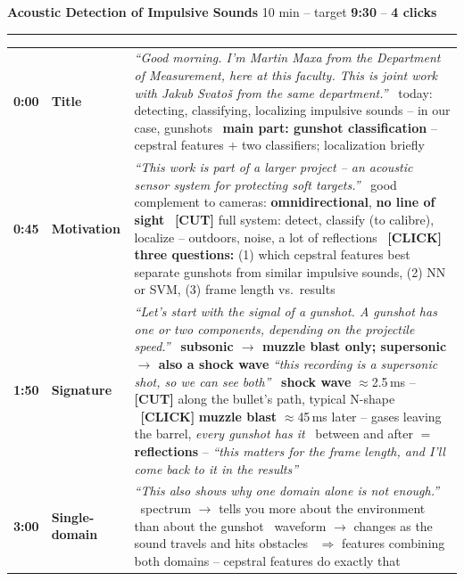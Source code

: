 \documentclass[10pt,a4paper]{article}
\newcommand{\say}[1]{\textit{\color{black!75}``#1''}}
\newcommand{\bt}{\newline\raisebox{0.15ex}{\tiny$\blacksquare$}~}
\newcommand{\cue}[3]{%
  \textbf{\color{ctublue}#1} & \textbf{#2} & #3 \\[1.5ex]}
\begin{document}
{\large\bfseries Acoustic Detection of Impulsive Sounds}\hfill
{\small 10 min -- target \textbf{9:30} -- \textbf{4 clicks}}

\vspace{0.5mm}\hrule\vspace{2mm}

{\small
\begin{tabular}{@{}>{\raggedright\arraybackslash}p{10mm} >{\raggedright\arraybackslash}p{19mm} >{\raggedright\arraybackslash}p{147mm}@{}}

\cue{0:00}{Title}{%
  \say{Good morning. I'm Martin Maxa from the Department of Measurement, here at this
  faculty. This is joint work with Jakub Svatoš from the same department.}
  \bt today: detecting, classifying, localizing impulsive sounds -- in our case, gunshots
  \bt \textbf{main part: gunshot classification} -- cepstral features $+$ two
  classifiers; localization briefly}

\cue{0:45}{Motivation}{%
  \say{This work is part of a larger project -- an acoustic sensor system for protecting
  soft targets.}
  \bt good complement to cameras: \textbf{omnidirectional}, \textbf{no line of sight}
  \bt \textbf{[CUT]} full system: detect, classify (to calibre), localize -- outdoors,
  noise, a lot of reflections
  \bt \textbf{\color{accent}[CLICK]} \textbf{three questions:} (1) which cepstral
  features best separate gunshots from similar impulsive sounds, (2) NN or SVM,
  (3) frame length vs.\ results}

\cue{1:50}{Signature}{%
  \say{Let's start with the signal of a gunshot. A gunshot has one or two components,
  depending on the projectile speed.}
  \bt \textbf{subsonic $\to$ muzzle blast only; supersonic $\to$ also a shock wave}
  \say{this recording is a supersonic shot, so we can see both}
  \bt \textbf{shock wave} $\approx$2.5\,ms -- \textbf{[CUT]} along the bullet's path, typical
  N-shape
  \bt \textbf{\color{accent}[CLICK]} \textbf{muzzle blast} $\approx$45\,ms later -- gases
  leaving the barrel, \emph{every gunshot has it}
  \bt between and after $=$ \textbf{reflections} -- \say{this matters for the frame length,
  and I'll come back to it in the results}}

\cue{3:00}{Single-domain}{%
  \say{This also shows why one domain alone is not enough.}
  \bt spectrum $\to$ tells you more about the environment than about the gunshot
  \bt waveform $\to$ changes as the sound travels and hits obstacles
  \bt $\Rightarrow$ features combining both domains -- cepstral features do exactly that}


\end{tabular}}
\end{document}
